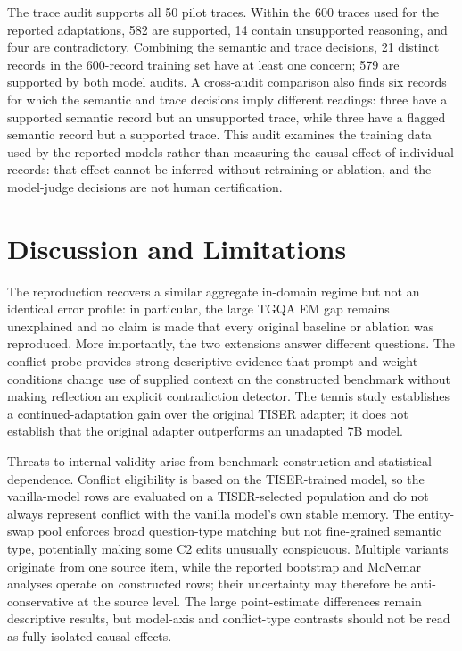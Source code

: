 \documentclass[conference]{IEEEtran}
\begin{document}
The trace audit supports all 50 pilot traces. Within the 600 traces used for the reported adaptations, 582 are supported, 14 contain unsupported reasoning, and four are contradictory. Combining the semantic and trace decisions, 21 distinct records in the 600-record training set have at least one concern; 579 are supported by both model audits. A cross-audit comparison also finds six records for which the semantic and trace decisions imply different readings: three have a supported semantic record but an unsupported trace, while three have a flagged semantic record but a supported trace. This audit examines the training data used by the reported models rather than measuring the causal effect of individual records: that effect cannot be inferred without retraining or ablation, and the model-judge decisions are not human certification.

\section{Discussion and Limitations}

The reproduction recovers a similar aggregate in-domain regime but not an identical error profile: in particular, the large TGQA EM gap remains unexplained and no claim is made that every original baseline or ablation was reproduced. More importantly, the two extensions answer different questions. The conflict probe provides strong descriptive evidence that prompt and weight conditions change use of supplied context on the constructed benchmark without making reflection an explicit contradiction detector. The tennis study establishes a continued-adaptation gain over the original TISER adapter; it does not establish that the original adapter outperforms an unadapted 7B model.

Threats to internal validity arise from benchmark construction and statistical dependence. Conflict eligibility is based on the TISER-trained model, so the vanilla-model rows are evaluated on a TISER-selected population and do not always represent conflict with the vanilla model's own stable memory. The entity-swap pool enforces broad question-type matching but not fine-grained semantic type, potentially making some C2 edits unusually conspicuous. Multiple variants originate from one source item, while the reported bootstrap and McNemar analyses operate on constructed rows; their uncertainty may therefore be anti-conservative at the source level. The large point-estimate differences remain descriptive results, but model-axis and conflict-type contrasts should not be read as fully isolated causal effects.
\end{document}
